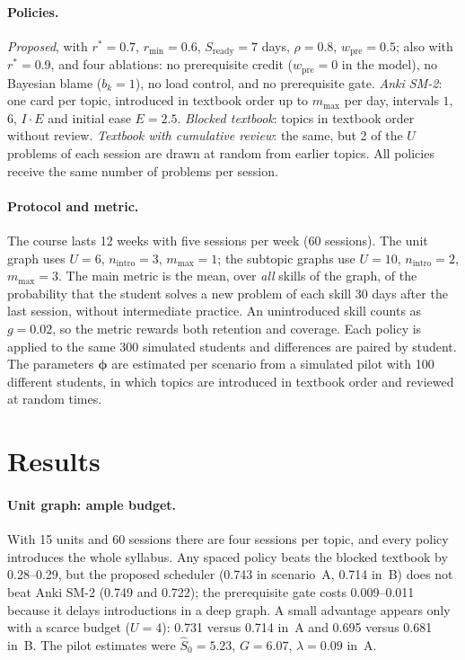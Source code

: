 \documentclass[runningheads]{llncs}
\newcommand{\Sh}{\hat S}
\newcommand{\rstar}{r^{\ast}}
\newcommand{\Slisto}{S_{\mathrm{ready}}}
\begin{document}
\paragraph{Policies.} \emph{Proposed}, with $\rstar=0.7$, $r_{\min}=0.6$, $\Slisto=7$ days, $\rho=0.8$, $w_{\mathrm{pre}}=0.5$; also with $\rstar=0.9$, and four ablations: no prerequisite credit ($w_{\mathrm{pre}}=0$ in the model), no Bayesian blame ($b_k=1$), no load control, and no prerequisite gate. \emph{Anki SM-2}: one card per topic, introduced in textbook order up to $m_{\max}$ per day, intervals $1$, $6$, $I\cdot E$ and initial ease $E=2.5$. \emph{Blocked textbook}: topics in textbook order without review. \emph{Textbook with cumulative review}: the same, but 2 of the $U$ problems of each session are drawn at random from earlier topics. All policies receive the same number of problems per session.

\paragraph{Protocol and metric.} The course lasts 12 weeks with five sessions per week (60 sessions). The unit graph uses $U=6$, $n_{\mathrm{intro}}=3$, $m_{\max}=1$; the subtopic graphs use $U=10$, $n_{\mathrm{intro}}=2$, $m_{\max}=3$. The main metric is the mean, over \emph{all} skills of the graph, of the probability that the student solves a new problem of each skill 30 days after the last session, without intermediate practice. An unintroduced skill counts as $g=0.02$, so the metric rewards both retention and coverage. Each policy is applied to the same 300 simulated students and differences are paired by student. The parameters $\bm\phi$ are estimated per scenario from a simulated pilot with 100 different students, in which topics are introduced in textbook order and reviewed at random times.

\section{Results}
\label{sec:results}

\paragraph{Unit graph: ample budget.} With 15 units and 60 sessions there are four sessions per topic, and every policy introduces the whole syllabus. Any spaced policy beats the blocked textbook by 0.28--0.29, but the proposed scheduler (0.743 in scenario~A, 0.714 in~B) does not beat Anki SM-2 (0.749 and 0.722); the prerequisite gate costs 0.009--0.011 because it delays introductions in a deep graph. A small advantage appears only with a scarce budget ($U=4$): 0.731 versus 0.714 in~A and 0.695 versus 0.681 in~B. The pilot estimates were $\Sh_0=5.23$, $G=6.07$, $\lambda=0.09$ in~A.
\end{document}
